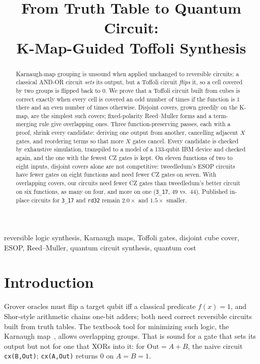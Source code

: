 \documentclass[conference]{IEEEtran}
\newcommand{\code}[1]{\texttt{#1}}
\theoremstyle{plain}
\begin{document}
\title{From Truth Table to Quantum Circuit:\\K-Map-Guided Toffoli Synthesis}
\author{
}

\maketitle

\begin{abstract}
Karnaugh-map grouping is unsound when applied unchanged to reversible
circuits: a classical AND-OR circuit \emph{sets} its output, but a
Toffoli circuit \emph{flips} it, so a cell covered by two groups is
flipped back to $0$. We prove that a Toffoli circuit built from cubes is
correct exactly when every cell is covered an odd number of times if the
function is $1$ there and an even number of times otherwise. Disjoint
covers, grown greedily on the K-map, are the simplest such covers;
fixed-polarity Reed--Muller forms and a term-merging rule give
overlapping ones. Three function-preserving passes, each with a proof,
shrink every candidate: deriving one output from another, cancelling
adjacent $X$ gates, and reordering terms so that more $X$ gates cancel.
Every candidate is checked by exhaustive simulation, transpiled to a
model of a 133-qubit IBM device and checked again, and the one with the
fewest CZ gates is kept. On eleven functions of two to eight inputs,
disjoint covers alone are not competitive: tweedledum's ESOP circuits
have fewer gates on eight functions and need fewer CZ gates on seven.
With overlapping covers, our circuits need fewer CZ gates than
tweedledum's better circuit on six functions, as many on four, and more
on one (\texttt{3\_17}, $49$ vs.\ $44$). Published in-place circuits for
\texttt{3\_17} and \texttt{rd32} remain $2.0\times$ and $1.5\times$
smaller.
\end{abstract}

\begin{IEEEkeywords}
reversible logic synthesis, Karnaugh maps, Toffoli gates, disjoint cube
cover, ESOP, Reed--Muller, quantum circuit synthesis, quantum cost
\end{IEEEkeywords}

\section{Introduction}
Grover oracles must flip a target qubit iff a classical predicate
$f(x)=1$, and Shor-style arithmetic chains one-bit adders; both need
correct reversible circuits built from truth tables. The textbook tool
for minimizing such logic, the Karnaugh map~\cite{karnaugh1953}, allows
overlapping groups. That is sound for a gate that sets its output but
not for one that XORs into it: for $\mathrm{Out}=A+B$, the naive circuit
\code{cx(B,Out)}; \code{cx(A,Out)} returns $0$ on $A{=}B{=}1$.
\end{document}
